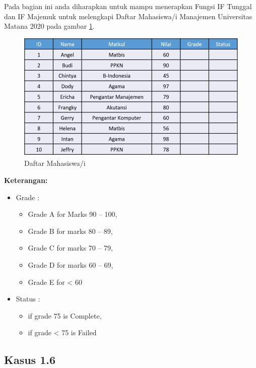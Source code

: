 \documentclass[
]{book}
\providecommand{\tightlist}{%
  \setlength{\itemsep}{0pt}\setlength{\parskip}{0pt}}
\begin{document}
Pada bagian ini anda diharapkan untuk mampu menerapkan Fungsi IF Tunggal dan IF Majemuk untuk melengkapi Daftar Mahasiswa/i Manajemen Universitas Matana 2020 pada gambar \ref{fig:tabel5}.

\begin{figure}

{\centering \includegraphics[width=1\linewidth]{images/tabel5} 

}

\caption{Daftar Mahasiswa/i}\label{fig:tabel5}
\end{figure}

\textbf{Keterangan:}

\begin{itemize}
\item
  Grade :

  \begin{itemize}
  \tightlist
  \item
    Grade A for Marks 90 -- 100,
  \item
    Grade B for marks 80 -- 89,
  \item
    Grade C for marks 70 -- 79,
  \item
    Grade D for marks 60 -- 69,
  \item
    Grade E for \textless{} 60
  \end{itemize}
\item
  Status :

  \begin{itemize}
  \tightlist
  \item
    if grade 75 is Complete,
  \item
    if grade \textless{} 75 is Failed
  \end{itemize}
\end{itemize}

\hypertarget{kasus-1.6}{%
\subsection*{Kasus 1.6}\label{kasus-1.6}}
\end{document}
